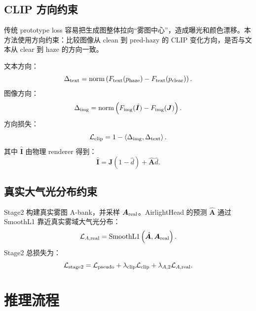 \documentclass[11pt,a4paper]{ctexart}
\begin{document}
\subsection{CLIP 方向约束}

传统 prototype loss 容易把生成图整体拉向“雾图中心”，造成曝光和颜色漂移。本方法使用方向约束：比较图像从 clean 到 pred-hazy 的 CLIP 变化方向，是否与文本从 clear 到 haze 的方向一致。

文本方向：
\begin{equation}
  \Delta_{\rm text}
  =
  {\rm norm}\left(
    F_{\rm text}(p_{\rm haze}) -
    F_{\rm text}(p_{\rm clear})
  \right).
\end{equation}
图像方向：
\begin{equation}
  \Delta_{\rm img}
  =
  {\rm norm}\left(
    F_{\rm img}(\hat{\bm{I}}) -
    F_{\rm img}(\bm{J})
  \right).
\end{equation}
方向损失：
\begin{equation}
  \mathcal{L}_{\rm clip}
  =
  1 -
  \left\langle
    \Delta_{\rm img},
    \Delta_{\rm text}
  \right\rangle.
  \label{eq:clip_loss}
\end{equation}
其中 $\hat{\bm{I}}$ 由物理 renderer 得到：
\begin{equation}
  \hat{\bm{I}}
  =
  \bm{J}(1-\hat{d})+\hat{\bm{A}}\hat{d}.
\end{equation}

\subsection{真实大气光分布约束}

Stage2 构建真实雾图 A-bank，并采样 $\bm{A}_{\rm real}$。AirlightHead 的预测 $\hat{\bm{A}}$ 通过 SmoothL1 靠近真实雾域大气光分布：
\begin{equation}
  \mathcal{L}_{A,{\rm real}}
  =
  {\rm SmoothL1}\left(
    \hat{\bm{A}},
    \bm{A}_{\rm real}
  \right).
\end{equation}
Stage2 总损失为：
\begin{equation}
  \mathcal{L}_{\rm stage2}
  =
  \mathcal{L}_{\rm pseudo}
  +
  \lambda_{\rm clip}\mathcal{L}_{\rm clip}
  +
  \lambda_{A,2}\mathcal{L}_{A,{\rm real}}.
  \label{eq:stage2_loss}
\end{equation}

\section{推理流程}
\end{document}
